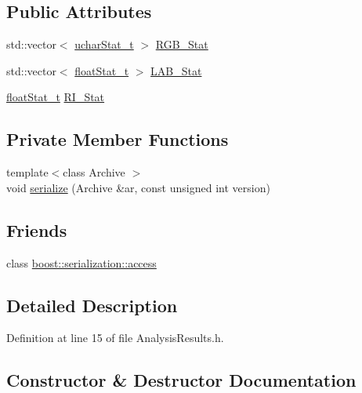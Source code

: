 \subsection*{Public Attributes}
\begin{DoxyCompactItemize}
\item 
std\+::vector$<$ \hyperlink{_stats_8h_a5b876b087ada3df30b8dd6309fc25191}{uchar\+Stat\+\_\+t} $>$ \hyperlink{class_soil_analyzer_1_1_analysis_results_ab35eca5f2cfca4b80797cfc314d5cdf5}{R\+G\+B\+\_\+\+Stat}
\item 
std\+::vector$<$ \hyperlink{_stats_8h_a5f9676504b14f796e82c229b4dddc50b}{float\+Stat\+\_\+t} $>$ \hyperlink{class_soil_analyzer_1_1_analysis_results_ae931f7b47ece1f91dc3427520ef4a9b2}{L\+A\+B\+\_\+\+Stat}
\item 
\hyperlink{_stats_8h_a5f9676504b14f796e82c229b4dddc50b}{float\+Stat\+\_\+t} \hyperlink{class_soil_analyzer_1_1_analysis_results_a3bbccb36afd62b9a35b7afa578c4919d}{R\+I\+\_\+\+Stat}
\end{DoxyCompactItemize}
\subsection*{Private Member Functions}
\begin{DoxyCompactItemize}
\item 
{\footnotesize template$<$class Archive $>$ }\\void \hyperlink{class_soil_analyzer_1_1_analysis_results_a64f3587b6a868fc82a72369b3883459a}{serialize} (Archive \&ar, const unsigned int version)
\end{DoxyCompactItemize}
\subsection*{Friends}
\begin{DoxyCompactItemize}
\item 
class \hyperlink{class_soil_analyzer_1_1_analysis_results_ac98d07dd8f7b70e16ccb9a01abf56b9c}{boost\+::serialization\+::access}
\end{DoxyCompactItemize}


\subsection{Detailed Description}


Definition at line 15 of file Analysis\+Results.\+h.



\subsection{Constructor \& Destructor Documentation}
\hypertarget{class_soil_analyzer_1_1_analysis_results_a893864c1e4bf50bf6979088a390da482}{}
